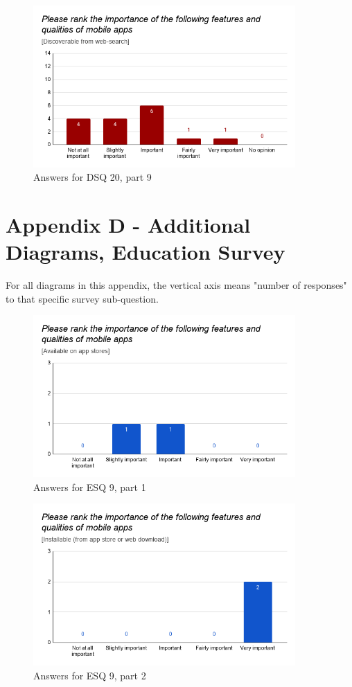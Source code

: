 \documentclass[a4paper,12pt]{article}
\begin{document}
\begin{figure}[ht!]
    \centering
    \includegraphics[width=10cm]{img/Results/dsq20_9.png}
    \caption{Answers for DSQ 20, part 9}
    \label{fig:res_devq20_9}
\end{figure}

\newpage

\section{Appendix D - Additional Diagrams, Education Survey}
\label{Appendix_eduMultiDiagrams}
For all diagrams in this appendix, the vertical axis means "number of responses" to that specific survey sub-question.

\vspace{-10px}

\begin{figure}[ht!]
    \centering
    \includegraphics[width=10cm]{img/Results/esq9_1.png}
    \caption{Answers for ESQ 9, part 1}
    \label{fig:res_eduq9_1}
\end{figure}

\vspace{-10px}

\begin{figure}[ht!]
    \centering
    \includegraphics[width=10cm]{img/Results/esq9_2.png}
    \caption{Answers for ESQ 9, part 2}
    \label{fig:res_eduq9_2}
\end{figure}
\end{document}
